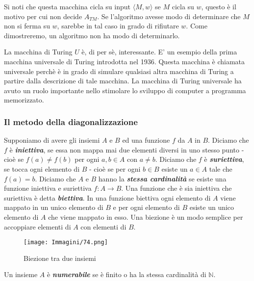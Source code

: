 \documentclass{article}
\begin{document}
Si noti che questa macchina cicla su input $\langle M,w \rangle$ se $M$ cicla su $w$, questo è il motivo per cui non decide $A_{TM}$.
Se l'algoritmo avesse modo di determinare che $M$ non si ferma su $w$, sarebbe in tal caso in grado di rifiutare $w$.
Come dimostreremo, un algoritmo non ha modo di determinarlo.

La macchina di Turing $U$ è, di per sè, interessante.
E' un esempio della prima macchina universale di Turing introdotta nel 1936.
Questa macchina è chiamata universale perchè è in grado di simulare qualsiasi altra macchina di Turing a partire dalla descrizione di tale macchina.
La macchina di Turing universale ha avuto un ruolo importante nello stimolare lo sviluppo di computer a programma memorizzato.

\subsubsection{Il metodo della diagonalizzazione}

\begin{tcolorbox}[title=Definizione 4.12]
\label{definizione-4.12}
Supponiamo di avere gli insiemi $A$ e $B$ ed una funzione $f$ da $A$ in $B$.
Diciamo che $f$ è \textbf{\textit{iniettiva}}, se essa non mappa mai due elementi diversi in uno stesso punto - cioè se $f(a) \neq f(b)$ per ogni $a,b \in A$ con $a \neq b$.
Diciamo che $f$ è \textbf{\textit{suriettiva}}, se tocca ogni elemento di $B$ - cioè se per ogni $b \in B$ esiste un $a \in A$ tale che $f(a) = b$.
Diciamo che $A$ e $B$ hanno la \textbf{\textit{stessa cardinalità}} se esiste una funzione iniettiva e suriettiva $f : A \rightarrow B$.
Una funzione che è sia iniettiva che suriettiva è detta \textbf{\textit{biettiva}}.
In una funzione biettiva ogni elemento di $A$ viene mappato in un unico elemento di $B$ e per ogni elemento di $B$ esiste un unico elemento di $A$ che viene mappato in esso.
Una biezione è un modo semplice per accoppiare elementi di $A$ con elementi di $B$.
\end{tcolorbox}

\begin{figure}[H]
    \centering
    \texttt{[image: Immagini/74.png]}
    \caption{Biezione tra due insiemi}
    \label{figura-4.13}
\end{figure}

\begin{tcolorbox}[title=Definizione 4.14]
    Un insieme $A$ è \textbf{\textit{numerabile}} se è finito o ha la stessa cardinalità di $\mathbb{N}$.    
\end{tcolorbox}
\end{document}

